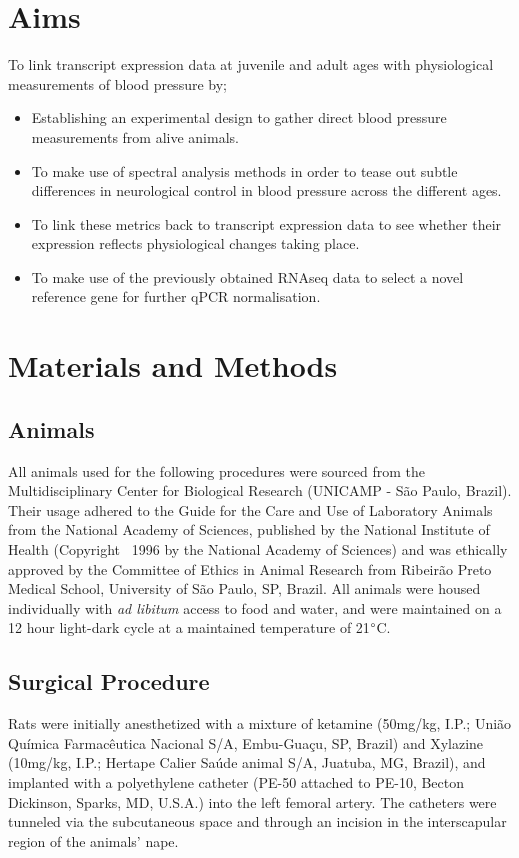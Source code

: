 \section{Aims}
To link transcript expression data at juvenile and adult ages with physiological measurements of blood pressure by;\\
\begin{itemize}
\singlespacing
\setlength
	\item Establishing an experimental design to gather direct blood pressure measurements from alive animals.\\
	\item To make use of spectral analysis methods in order to tease out subtle differences in neurological control in blood pressure across the different ages. \\
	\item To link these metrics back to transcript expression data to see whether their expression reflects physiological changes taking place. \\
	\item To make use of the previously obtained RNAseq data to select a novel reference gene for further qPCR normalisation. \\
\end{itemize}

\doublespacing
\section{Materials and Methods}

\subsection{Animals}
All animals used for the following procedures were sourced from the Multidisciplinary Center for Biological Research (UNICAMP - São Paulo, Brazil). Their usage adhered to the Guide for the Care and Use of Laboratory Animals from the National Academy of Sciences, published by the National Institute of Health (Copyright \textcopyright\ 1996 by the National Academy of Sciences) and was ethically approved by the Committee of Ethics in Animal Research from Ribeirão Preto Medical School, University of São Paulo, SP, Brazil. All animals were housed individually with \textit{ad libitum} access to food and water, and were maintained on a 12 hour light-dark cycle at a maintained temperature of 21$\degree$C.

\subsection{Surgical Procedure}
Rats were initially anesthetized with a mixture of ketamine (50mg/kg, I.P.; União Química Farmacêutica Nacional S/A, Embu-Guaçu, SP, Brazil) and Xylazine (10mg/kg, I.P.; Hertape Calier Saúde animal S/A, Juatuba, MG, Brazil), and implanted with a polyethylene catheter (PE-50 attached to PE-10, Becton Dickinson, Sparks, MD, U.S.A.) into the left femoral artery. The catheters were tunneled via the subcutaneous space and through an incision in the interscapular region of the animals' nape. 

